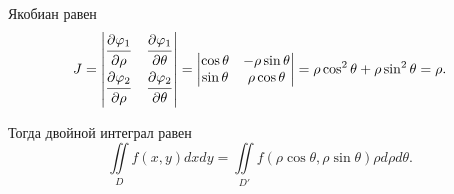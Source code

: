 \documentclass[a4paper,12pt,oneside]{extbook}
\theoremstyle{numbered}
\theoremstyle{unnumbered}
\theoremstyle{named}
\theoremstyle{unnumbered}
\theoremstyle{named}
\theoremstyle{named}
\theoremstyle{named}
\begin{document}
Якобиан равен
\begin{equation}
    J =
    \begin{vmatrix}
        \dfrac{\strut \partial \varphi_1}{\strut \partial \rho} & \dfrac{\strut \partial \varphi_1}{\strut \partial \theta} \\
        \dfrac{\strut \partial \varphi_2}{\strut \partial \rho} & \dfrac{\strut \partial \varphi_2}{\strut \partial \theta}
    \end{vmatrix}
    =
    \begin{vmatrix}
        \cos \theta & -\rho \sin \theta \\
        \sin \theta & \rho \cos \theta
    \end{vmatrix}
    = \rho \cos^2 \theta + \rho \sin^2 \theta = \rho.
\end{equation}

Тогда двойной интеграл равен
\begin{equation}
    \iint\limits_{D} f(x, y)dxdy = \iint\limits_{D'} f(\rho \cos \theta, \rho \sin \theta) \rho d\rho d\theta.
\end{equation}
\end{document}
